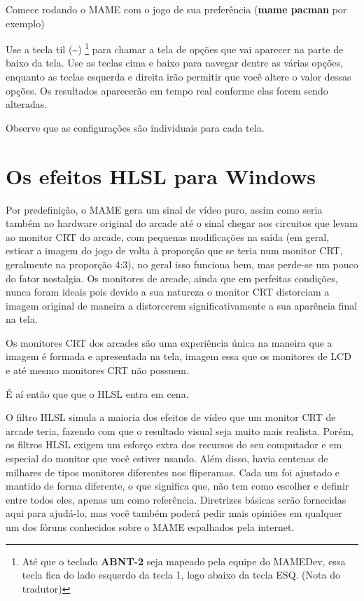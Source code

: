 \documentclass[letterpaper,10pt,brazil]{sphinxmanual}
\begin{document}
Comece rodando o MAME com o jogo de sua preferência (\textbf{mame pacman} por
exemplo)

Use a tecla til (\textbf{\textasciitilde{}}) \footnote[1]{\sphinxAtStartFootnote%
Até que o teclado \textbf{ABNT-2} seja mapeado pela equipe do MAMEDev,
essa tecla fica do lado esquerdo da tecla 1, logo abaixo da
tecla ESQ. (Nota do tradutor)
} para chamar a tela de opções que vai
aparecer na parte de baixo da tela. Use as teclas cima e baixo para
navegar dentre as várias opções, enquanto as teclas esquerda e direita
irão permitir que você altere o valor dessas opções. Os resultados
aparecerão em tempo real conforme elas forem sendo alteradas.

Observe que as configurações são individuais para cada tela.


\section{Os efeitos HLSL para Windows}
\label{advanced/hlsl::doc}\label{advanced/hlsl:os-efeitos-hlsl-para-windows}
Por predefinição, o MAME gera um sinal de vídeo puro, assim como seria
também no hardware original do arcade até o sinal chegar aos circuitos
que levam ao monitor CRT do arcade, com pequenas modificações na saída
(em geral, esticar a imagem do jogo de volta à proporção que se teria
num monitor CRT, geralmente na proporção 4:3), no geral isso funciona
bem, mas perde-se um pouco do fator nostalgia. Os monitores de arcade,
ainda que em perfeitas condições, nunca foram ideais pois devido a sua
natureza o monitor CRT distorciam a imagem original de maneira a
distorcerem significativamente a sua aparência final na tela.

Os monitores CRT dos arcades são uma experiência única na maneira que a
imagem é formada e apresentada na tela, imagem essa que os monitores de
LCD e até mesmo monitores CRT não possuem.

É aí então que que o HLSL entra em cena.

O filtro HLSL simula a maioria dos efeitos de vídeo que um monitor CRT
de arcade teria, fazendo com que o resultado visual seja muito mais
realista. Porém, os filtros HLSL exigem um esforço extra dos recursos do
seu computador e em especial do monitor que você estiver usando.
Além disso, havia centenas de milhares de tipos monitores diferentes nos
fliperamas. Cada um foi ajustado e mantido de forma diferente, o que
significa que, não tem como escolher e definir entre todos eles, apenas
um como referência. Diretrizes básicas serão fornecidas aqui para
ajudá-lo, mas você também poderá pedir mais opiniões em qualquer um dos
fóruns conhecidos sobre o MAME espalhados pela internet.
\end{document}
